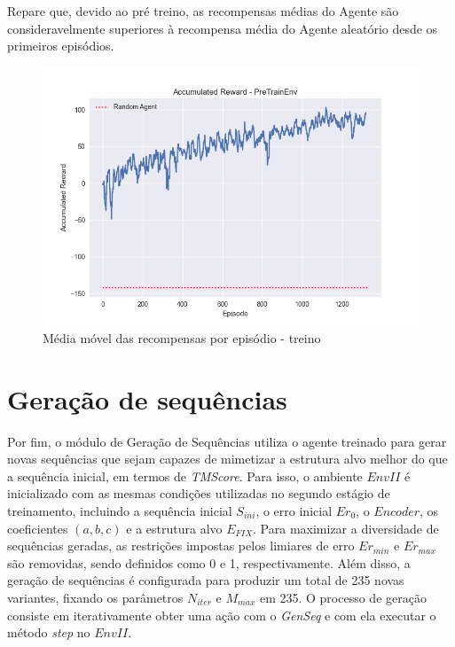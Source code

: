   Repare que, devido ao pré treino, as recompensas médias do Agente são consideravelmente superiores
  à recompensa média do Agente aleatório desde os primeiros episódios. 
  \begin{figure}[H]
    \centering
    \includegraphics[width=.8\linewidth]{figuras/plot_train_reward.jpg}    
    \caption{Média móvel das recompensas por episódio - treino}
    \label{fig:rew_per_ep_train}
  \end{figure}
  

\section{Geração de sequências}
Por fim, o módulo de Geração de Sequências utiliza o agente treinado para gerar novas 
sequências que sejam capazes de mimetizar a estrutura alvo melhor do que a sequência inicial, em termos de \textit{TMScore}.  
Para isso, o ambiente $EnvII$ é inicializado com as mesmas condições utilizadas no segundo estágio de treinamento,
incluindo a sequência inicial $S_{ini}$, o erro inicial $Er_{0}$, o $Encoder$, os coeficientes $(a, b, c)$ 
e a estrutura alvo $E_{FIX}$.
Para maximizar a diversidade de sequências geradas,
as restrições impostas pelos limiares de erro $Er_{min}$ e $Er_{max}$ são removidas, 
sendo definidos como 0 e 1, respectivamente. 
Além disso, a geração de sequências é configurada para produzir um total de 235 novas variantes, 
fixando os parâmetros $N_{iter}$ e $M_{max}$ em 235.
O processo de geração consiste em iterativamente obter uma ação com o \textit{GenSeq} 
e com ela executar o método \textit{step} no $EnvII$.

